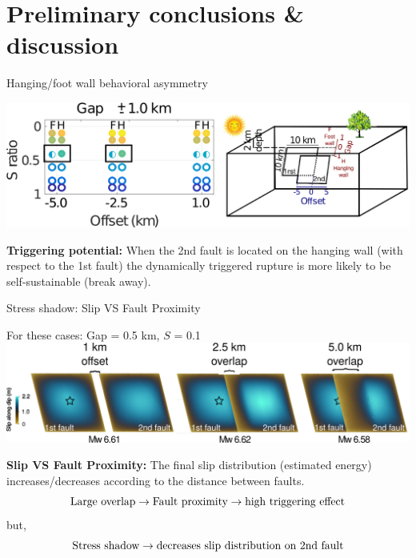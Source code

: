 \documentclass{beamer}
\begin{document}
\section{Preliminary conclusions \& discussion}

\begin{frame}
 {Hanging/foot wall behavioral asymmetry}
 
 \begin{center}
 \includegraphics[width=1\linewidth]{images/schematic_view_noparam.png} 
 \end{center}

{\bf Triggering potential:}
\vskip 0.2cm
When the 2nd fault is located on the hanging wall (with respect to the 1st fault) the dynamically triggered rupture is more likely to be self-sustainable (break away).

\end{frame}



\begin{frame}
 {Stress shadow: Slip VS Fault Proximity}

\begin{center}
\vskip -0.2cm    \centering For these cases: Gap = 0.5 km, $S$ = 0.1 
\vskip 0.2cm \includegraphics[width=1\linewidth]{images/stress_shadow.png}
\end{center}
\vskip -0.2cm
{\bf Slip VS Fault Proximity:}
\vskip 0cm
The final slip distribution (estimated energy) increases/decreases according to the distance between faults. 
\vskip -0.6cm \pause
\begin{equation*}
 \textnormal{Large overlap} \rightarrow \textnormal{Fault proximity} \rightarrow \textnormal{high triggering effect} 
\end{equation*}
\vskip -0.6cm
but, \pause
\vskip -0.8cm
\begin{equation*}
 \textnormal{Stress shadow} \rightarrow \textnormal{decreases slip distribution on 2nd fault}
\end{equation*}
 
\end{frame}
\end{document}
